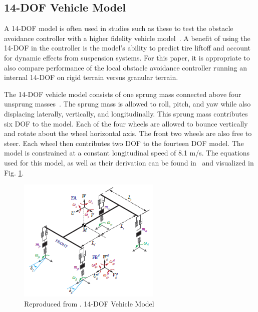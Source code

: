 \documentclass[12pt,onecolumn]{report}
\begin{document}

\subsection{14-DOF Vehicle Model}\label{ss:14DOFModel}
A 14-DOF model is often used in studies such as these to test the obstacle avoidance controller with a higher fidelity vehicle model~\cite{ModelFidelity2016, ModelFidelity2013}. A benefit of using the 14-DOF in the controller is the model's ability to predict tire liftoff and account for dynamic effects from suspension systems. For this paper, it is appropriate to also compare performance of the local obstacle avoidance controller running an internal 14-DOF on rigid terrain versus granular terrain.  

The 14-DOF vehicle model consists of one sprung mass connected above four unsprung masses~\cite{RollStudies2007}. The sprung mass is allowed to roll, pitch, and yaw while also displacing laterally, vertically, and longitudinally. This sprung mass contributes six DOF to the model. Each of the four wheels are allowed to bounce vertically and rotate about the wheel horizontal axis. The front two wheels are also free to steer. Each wheel then contributes two DOF to the fourteen DOF model. The model is constrained at a constant longitudinal speed of 8.1 m/s. The equations used for this model, as well as their derivation can be found in~\cite{RollStudies2007} and visualized in Fig. \ref{fig:14DOF}.

\begin{figure}
	\centering
	\includegraphics[width=0.8\columnwidth]{Figs/14DOF_Stein.png}
	\caption{\small Reproduced from \protect\cite{RollStudies2007}. 14-DOF Vehicle Model}  
	\label{fig:14DOF}
\end{figure}
\end{document}
